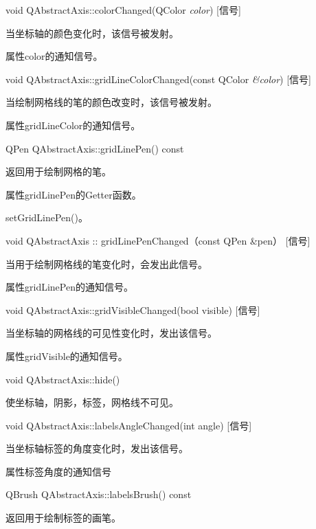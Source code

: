 void QAbstractAxis::colorChanged(QColor \emph{color}) [信号] 

当坐标轴的颜色变化时，该信号被发射。 

\begin{notice}
属性color的通知信号。
\end{notice}

void QAbstractAxis::gridLineColorChanged(const QColor \emph{\&color}) [信号] 

当绘制网格线的笔的颜色改变时，该信号被发射。

\begin{notice}
属性gridLineColor的通知信号。
\end{notice}

QPen QAbstractAxis::gridLinePen() const

返回用于绘制网格的笔。 

\begin{notice}
属性gridLinePen的Getter函数。 
\end{notice}

\begin{seeAlso}
setGridLinePen()。
\end{seeAlso}

void QAbstractAxis :: gridLinePenChanged（const QPen \&pen） [信号] 

当用于绘制网格线的笔变化时，会发出此信号。 



\begin{notice}
属性gridLinePen的通知信号。
\end{notice}

void QAbstractAxis::gridVisibleChanged(bool visible) [信号] 

当坐标轴的网格线的可见性变化时，发出该信号。 

\begin{notice}
属性gridVisible的通知信号。
\end{notice}

void QAbstractAxis::hide() 

使坐标轴，阴影，标签，网格线不可见。

void QAbstractAxis::labelsAngleChanged(int angle) [信号]

当坐标轴标签的角度变化时，发出该信号。 

\begin{notice}
属性标签角度的通知信号
\end{notice}

QBrush QAbstractAxis::labelsBrush() const 

返回用于绘制标签的画笔。 

